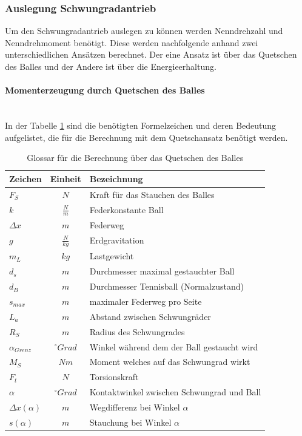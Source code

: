 \subsubsection{Auslegung Schwungradantrieb}
\label{BestimmungDrehmomentSchwundrad}
Um den Schwungradantrieb auslegen zu können werden Nenndrehzahl und Nenndrehmoment 
benötigt. Diese werden nachfolgende anhand zwei unterschiedlichen Ansätzen berechnet.
Der eine Ansatz ist über das Quetschen des Balles und der Andere ist über die 
Energieerhaltung.
%
\paragraph{Momenterzeugung durch Quetschen des Balles}$~~$\vspace{2mm}\\
In der Tabelle \ref{tab:glossarQuetschen} sind die benötigten Formelzeichen und 
deren Bedeutung aufgelistet, die für die Berechnung mit dem Quetschansatz benötigt 
werden.
\begin{table}[h!]
    \begin{tabular}{lcl}
        \rule{0pt}{11pt}Zeichen & Einheit & Bezeichnung \\
        \hline\rule{0pt}{11pt}$F_S$ & $N$ & Kraft für das Stauchen des Balles \\
        \rule{0pt}{11pt}$k$ & $\frac{N}{m}$ & Federkonstante Ball \\
        \rule{0pt}{11pt}$\Delta x$ & $m$ & Federweg \\
        \rule{0pt}{11pt}$g$ & $\frac{N}{kg}$ & Erdgravitation \\
        \rule{0pt}{11pt}$m_L$ & $kg$ & Lastgewicht \\
        \rule{0pt}{11pt}$d_s$ & $m$ & Durchmesser maximal gestauchter Ball \\
        \rule{0pt}{11pt}$d_B$ & $m$ & Durchmesser Tennisball (Normalzustand) \\
        \rule{0pt}{11pt}$s_{max}$ & $m$ & maximaler Federweg pro Seite \\
        \rule{0pt}{11pt}$L_a$ & $m$ & Abstand zwischen Schwungräder \\
        \rule{0pt}{11pt}$R_S$ & $m$ & Radius des Schwungrades \\
        \rule{0pt}{11pt}$\alpha_{Grenz}$ & $^\circ Grad$ & Winkel während dem der Ball gestaucht wird \\
        \rule{0pt}{11pt}$M_S$ & $Nm$ & Moment welches auf das Schwungrad wirkt \\
        \rule{0pt}{11pt}$F_t$ & $N$ & Torsionskraft \\
        \rule{0pt}{11pt}$\alpha$ & $^\circ Grad$ & Kontaktwinkel zwischen Schwungrad und Ball \\
        \rule{0pt}{11pt}$\Delta x(\alpha)$ & $m$ & Wegdifferenz bei Winkel $\alpha$ \\
        \rule{0pt}{11pt}$s(\alpha)$ & $m$ & Stauchung bei Winkel $\alpha$ \\
    \end{tabular}
        \centering
        \caption{Glossar für die Berechnung über das Quetschen des Balles}
        \label{tab:glossarQuetschen}
\end{table}

